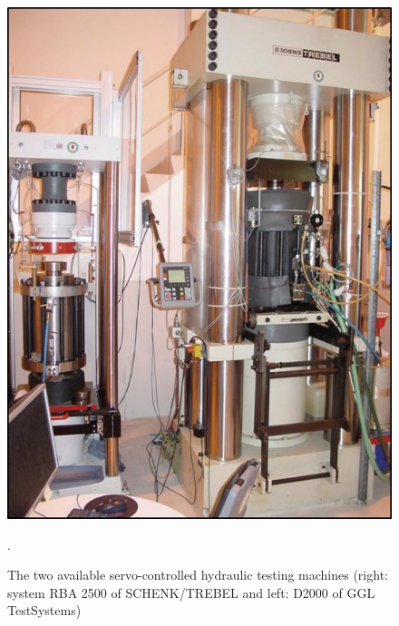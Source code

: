 \begin{figure}[!ht]
\centering
\includegraphics[width=1\textwidth]{./figures/ifg-lab-photo3.png}
\caption{The two available servo-controlled hydraulic testing machines (right: system RBA 2500 of SCHENK/TREBEL and left: D2000 of GGL TestSystems)}.
\label{fig:ifglabph2}
\end{figure}